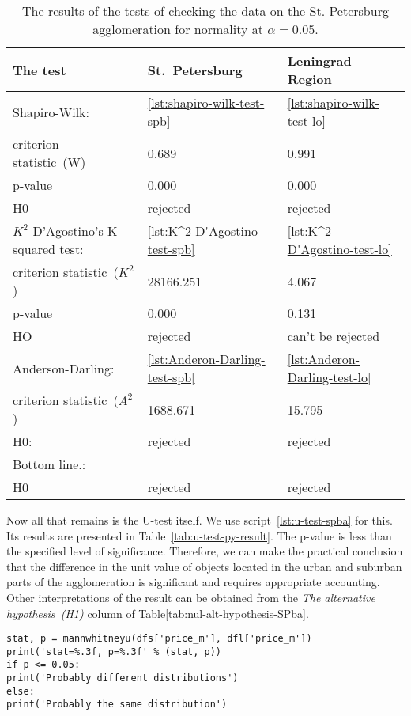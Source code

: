 \documentclass[]{scrreprt}
\begin{document}
\begin{table}[htp]
	\caption{The results of the tests of checking the data on the St. Petersburg agglomeration for normality at $\alpha=0.05$.}\label{tab:normality-tests-values}
	\centering
	\begin{tabular}{lll}
		\hline
		The test&St.~Petersburg&Leningrad Region\\
		\hline
		Shapiro-Wilk:&\ref{lst:shapiro-wilk-test-spb}&\ref{lst:shapiro-wilk-test-lo}\\
		criterion statistic~(W)&0.689&0.991\\
		p-value&0.000&0.000\\
		H0&rejected&rejected\\
		\hline
		$K^{2}$ D'Agostino's K-squared test:&\ref{lst:K^2-D'Agostino-test-spb}&\ref{lst:K^2-D'Agostino-test-lo}\\
		criterion statistic~($K^{2}$)&28166.251&4.067\\
	    p-value&0.000&0.131\\
		HO&rejected&can't be rejected\\
		\hline
		Anderson-Darling:&\ref{lst:Anderon-Darling-test-spb}&\ref{lst:Anderon-Darling-test-lo}\\
		criterion statistic~($A^{2}$)&1688.671&15.795\\
		H0:&rejected&rejected\\
		\hline
		Bottom line.:&&\\
		H0&rejected&rejected\\
		\hline
	\end{tabular}
\end{table}
%
Now all that remains is the U-test itself. We use script~\ref{lst:u-test-spba} for this. Its results are presented in Table~\ref{tab:u-test-py-result}. The p-value is less than the specified level of significance. Therefore, we can make the practical conclusion that the difference in the unit value of objects located in the urban and suburban parts of the agglomeration is significant and requires appropriate accounting. Other interpretations of the result can be obtained from the \textit{The alternative hypothesis~(H1)} column of Table\ref{tab:nul-alt-hypothesis-SPba}.
%
\begin{lstlisting}[float=htp, caption = Wilcoxon--~Mann--~Whitney test for the data of unit prices of apartment offers in the agglomeration of St.~Petersburg, firstnumber=1, label= lst:u-test-spba]
stat, p = mannwhitneyu(dfs['price_m'], dfl['price_m'])
print('stat=%.3f, p=%.3f' % (stat, p))
if p <= 0.05:
print('Probably different distributions')
else:
print('Probably the same distribution')
\end{lstlisting}  
\end{document}
